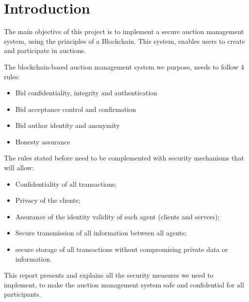 \newpage

\section{Introduction} 

The main objective of this project is to implement a secure auction management system, using the principles of a Blockchain. This system, enables users to create and participate in auctions.

\vspace*{5mm}

The blockchain-based auction management system we purpose, needs to follow 4 rules:
\begin{itemize}
    \item Bid confidentiality, integrity and authentication
    \item Bid acceptance control and confirmation
    \item Bid author identity and anonymity
    \item Honesty assurance 
\end{itemize}
The rules stated before need to be complemented with security mechanisms that will allow:
\begin{itemize}
    \item Confidentiality of all transactions;
    \item Privacy of the clients;
    \item Assurance of the identity validity of each agent (clients and servers);
    \item Secure transmission of all information between all agents;
    \item secure storage of all transactions without compromising private data or information.
\end{itemize}
This report presents and explains all the security measures we need to implement, to make the auction management system safe and confidential for all participants.